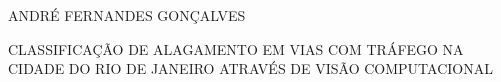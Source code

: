 \cleardoublepage


\pagestyle{ruledheader}
\setcounter{page}{1}

\cleardoublepage
\thispagestyle{empty}

\vspace{-60mm}

\begin{center}
   {\large ANDRÉ FERNANDES GONÇALVES}\\
   \vspace{7mm}

   \uppercase{Classificação de Alagamento em Vias com Tráfego na Cidade do Rio de Janeiro através de Visão Computacional}\\
  \vspace{10mm}
\end{center}

